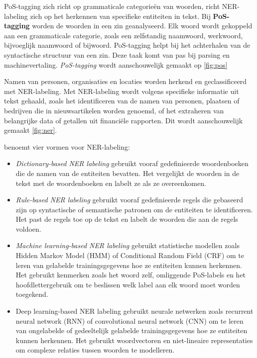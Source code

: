 PoS-tagging zich richt op grammaticale categorieën van woorden, richt NER-labeling zich op het herkennen van specifieke entiteiten in tekst. Bij \textbf{PoS-tagging} worden de woorden in een zin geanalyseerd. Elk woord wordt gekoppeld aan een grammaticale categorie, zoals een zelfstandig naamwoord, werkwoord, bijvoeglijk naamwoord of bijwoord. PoS-tagging helpt bij het achterhalen van de syntactische structuur van een zin. Deze taak komt van pas bij parsing en machinevertaling. \textit{PoS-tagging} wordt aanschouwelijk gemaakt op \ref{fig:pos}

Namen van personen, organisaties en locaties worden herkend en geclassificeerd met NER-labeling. Met NER-labeling wordt volgens \textcite{Jurafsky2014} specifieke informatie uit tekst gehaald, zoals het identificeren van de namen van personen, plaatsen of bedrijven die in nieuwsartikelen worden genoemd, of het extraheren van belangrijke data of getallen uit financiële rapporten. Dit wordt aanschouwelijk gemaakt \ref{fig:ner}. 


\textcite{Li2018} benoemt vier vormen voor NER-labeling:

\begin{itemize}
		\item \textit{Dictionary-based NER labeling} gebruikt vooraf gedefinieerde woordenboeken die de namen van de entiteiten bevatten. Het vergelijkt de woorden in de tekst met de woordenboeken en labelt ze als ze overeenkomen.
		\item \textit{Rule-based NER labeling} gebruikt vooraf gedefinieerde regels die gebaseerd zijn op syntactische of semantische patronen om de entiteiten te identificeren. Het past de regels toe op de tekst en labelt de woorden die aan de regels voldoen.
		\item \textit{Machine learning-based NER labeling} gebruikt statistische modellen zoals Hidden Markov Model (HMM) of Conditional Random Field (CRF) om te leren van gelabelde trainingsgegevens hoe ze entiteiten kunnen herkennen. Het gebruikt kenmerken zoals het woord zelf, omliggende PoS-labels en het hoofdlettergebruik om te beslissen welk label aan elk woord moet worden toegekend.
		\item Deep learning-based NER labeling gebruikt neurale netwerken zoals recurrent neural network (RNN) of convolutional neural network (CNN) om te leren van ongelabelde of gedeeltelijk gelabelde trainingsgegevens hoe ze entiteiten kunnen herkennen. Het gebruikt woordvectoren en niet-lineaire representaties om complexe relaties tussen woorden te modelleren.
\end{itemize}

